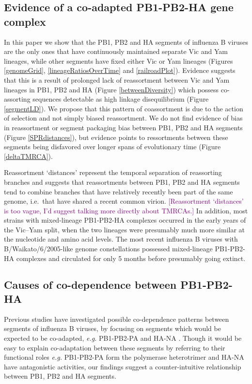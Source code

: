 \documentclass[11pt,oneside,letterpaper]{article}
\def\tbc#1{\textcolor{purple}{[#1]}}
\begin{document}
\subsection*{Evidence of a co-adapted PB1-PB2-HA gene complex}
In this paper we show that the PB1, PB2 and HA segments of influenza B viruses are the only ones that have continuously maintained separate Vic and Yam lineages, while other segments have fixed either Vic or Yam lineages (Figures \ref{genomeGrid}, \ref{lineageRatiosOverTime} and \ref{railroadPlot}).
Evidence suggests that this is a result of prolonged lack of reassortment between Vic and Yam lineages in PB1, PB2 and HA (Figure \ref{betweenDiversity}) which possess co-assorting sequences detectable as high linkage disequilibrium (Figure \ref{segmentLD}).
We propose that this pattern of coassortment is due to the action of selection and not simply biased reassortment.
We do not find evidence of bias in reassortment or segment packaging bias between PB1, PB2 and HA segments (Figure \ref{SPRdistances}), but evidence points to ressortments between these segments being disfavored over longer spans of evolutionary time (Figure \ref{deltaTMRCA}).

Reassortment `distances' represent the temporal separation of reassorting branches and suggests that reassortments between PB1, PB2 and HA segments tend to combine branches that have relatively recently been part of the same genome, i.e.\ that have shared a recent common virion.
\tbc{Reassortment `distances' is too vague, I'd suggest talking more directly about TMRCAs.}
In addition, most strains with mixed-lineage PB1-PB2-HA complexes occurred in the early years of the Vic--Yam split, when the two lineages were presumably much more similar at the nucleotide and amino acid levels.
The most recent influenza B viruses with B/Waikato/6/2005-like genome constellations possessed mixed-lineage PB1-PB2-HA complexes and circulated for only 5 months before presumably going extinct.

\subsection*{Causes of co-dependence between PB1-PB2-HA}
Previous studies have investigated possible co-dependence patterns between segments of influenza B viruses, by focusing on segments which would be expected to be co-adapted, \textit{e.g.} PB1-PB2-PA and HA-NA \cite{mccullers2004}.
Though it would be easy to explain co-adaptation between these segments by referring to their functional roles \textit{e.g.} PB1-PB2-PA form the polymerase heterotrimer and HA-NA have antagonistic activities, our findings suggest a counter-intuitive relationship between PB1, PB2 and HA segments.
\end{document}
